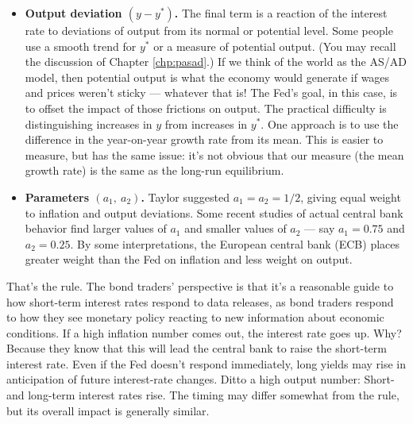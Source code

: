 \begin{itemize}
\item \textbf{Output deviation
 $( y - y^*)$.}
The final term is a reaction of the interest rate
to deviations of output from its normal or potential level.
Some people use a smooth trend for $y^*$
or a measure of potential output.
(You may recall the discussion of Chapter \ref{chp:pasad}.)
If we think of the world as the AS/AD model, then potential output is
what the economy would generate if wages and prices weren't sticky --- whatever that is!
The Fed's goal, in this case,
is to offset the impact of those frictions on output.
The practical difficulty is distinguishing
increases in $y$ from increases in $y^*$.
One approach is to use the difference in the year-on-year
growth rate from its mean.
This is easier to measure,
but has the same issue:  it's not obvious that our measure
(the mean growth rate) is the same as the long-run equilibrium.


\item \textbf{Parameters $(a_1, \ a_2)$.}
Taylor suggested $a_1 = a_2 = 1/2$,
giving equal weight to inflation and output deviations.
Some recent studies of actual central bank  behavior find larger values of $a_1$
and smaller values of $a_2$ --- say
$a_1 = 0.75$ and $a_2 = 0.25$.
By some interpretations, the European central bank  (ECB)
places greater weight than the Fed on inflation
and less weight on output.
\end{itemize}

That's the rule.
The bond  traders' perspective is that it's a reasonable guide to how
short-term interest rates respond to data releases,
as bond  traders respond to how they see monetary policy reacting
to new information about economic conditions.
If a high inflation number comes out, the interest rate goes up.
Why?  Because they know that this will lead the central bank  to raise
the short-term interest rate.
Even if the Fed doesn't respond immediately,
long yields 
 may rise in anticipation of future interest-rate changes.
Ditto a high output number: Short- and long-term interest rates rise.
The timing may differ somewhat from the rule,
but its overall impact is generally similar.


